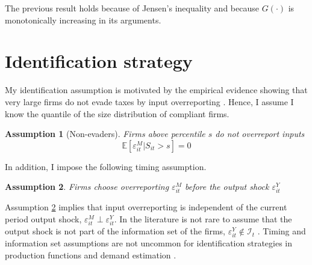 \documentclass[
  12pt]{article}
\newtheorem{ass}{Assumption}
\theoremstyle{definition}
\theoremstyle{remark}
\begin{document}
The previous result holds because of Jensen's inequality and because
\(G(\cdot)\) is monotonically increasing in its arguments.

\hypertarget{identification-strategy}{%
\section{Identification strategy}\label{identification-strategy}}

My identification assumption is motivated by the empirical evidence
showing that very large firms do not evade taxes by input overreporting
\citep{Carrillo2022}. Hence, I assume I know the quantile of the size
distribution of compliant firms.

\begin{tcolorbox}[enhanced jigsaw, toprule=.15mm, breakable, colback=white, leftrule=.75mm, rightrule=.15mm, left=2mm, colframe=quarto-callout-color-frame, arc=.35mm, bottomrule=.15mm, opacityback=0]

\begin{ass}[Non-evaders]\label{ass-comp}
Firms above percentile $s$ do not overreport inputs $$\mathbb{E}[\varepsilon^M_{it}|S_{it}>s]=0$$
\end{ass}

\end{tcolorbox}

In addition, I impose the following timing assumption.

\begin{tcolorbox}[enhanced jigsaw, toprule=.15mm, breakable, colback=white, leftrule=.75mm, rightrule=.15mm, left=2mm, colframe=quarto-callout-color-frame, arc=.35mm, bottomrule=.15mm, opacityback=0]

\begin{ass}\label{ass-ind}
Firms choose overreporting $\varepsilon^M_{it}$ \emph{before} the output shock $\varepsilon^Y_{it}$
\end{ass}

\end{tcolorbox}

Assumption \ref{ass-ind} implies that input overreporting is independent
of the current period output shock,
\(\varepsilon^M_{it} \perp \varepsilon^Y_{it}\). In the literature is
not rare to assume that the output shock is not part of the information
set of the firms, \(\varepsilon^Y_{it}\not\in \mathcal{I}_t\)
\citep{Gandhi2020}. Timing and information set assumptions are not
uncommon for identification strategies in production functions and
demand estimation \citep{Ackerberg2021, Ackerberg2019}.
\end{document}
